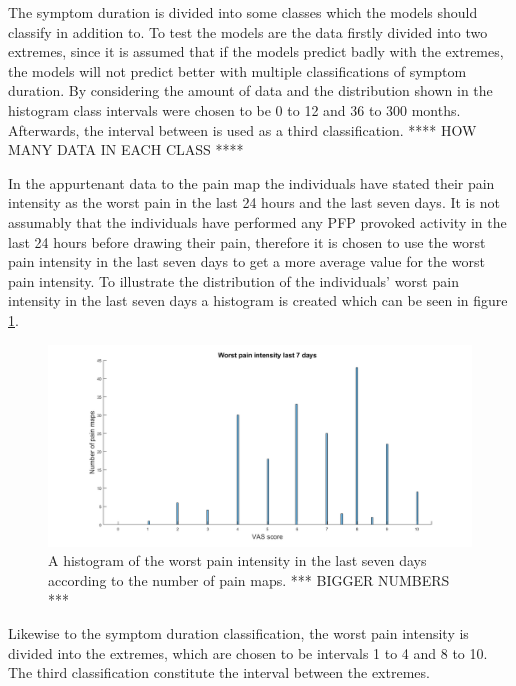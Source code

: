 \noindent
The symptom duration is divided into some classes which the models should classify in addition to. To test the models are the data firstly divided into two extremes, since it is assumed that if the models predict badly with the extremes, the models will not predict better with multiple classifications of symptom duration. 
By considering the amount of data and the distribution shown in the histogram class intervals were chosen to be 0 to 12 and 36 to 300 months. Afterwards, the interval between is used as a third classification. 
**** HOW MANY DATA IN EACH CLASS ****\newline

\noindent
In the appurtenant data to the pain map the individuals have stated their pain intensity as the worst pain in the last 24 hours and the last seven days.
It is not assumably that the individuals have performed any PFP provoked activity in the last 24 hours before drawing their pain, therefore it is chosen to use the worst pain intensity in the last seven days to get a more average value for the worst pain intensity.
To illustrate the distribution of the individuals’ worst pain intensity in the last seven days a histogram is created which can be seen in figure \ref{fig:histopain}.

\begin{figure} [H]
\centering
\includegraphics[width=1\textwidth]{figures/histrogramPain}
\caption{A histogram of the worst pain intensity in the last seven days according to the number of pain maps.  *** BIGGER NUMBERS ***}
\label{fig:histopain}
\end{figure}

\noindent
Likewise to the symptom duration classification, the worst pain intensity is divided into the extremes, which are chosen to be intervals 1 to 4 and 8 to 10. The third classification constitute the interval between the extremes.


